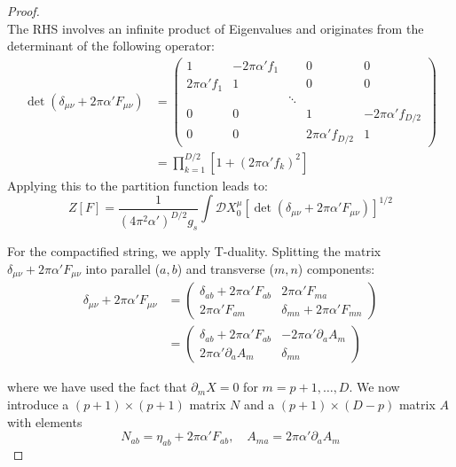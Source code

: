 \begin{tcolorbox}[breakable]
\begin{proof}
\begin{equation}
			\end{equation}
			The RHS involves an infinite product of Eigenvalues and originates from the determinant of the following operator:
			\begin{align*}
				\det (\delta_{\mu\nu} + 2\pi\alpha' F_{\mu\nu}) &= \begin{pmatrix} 
					1 & -2\pi\alpha' f_1 & & 0 & 0 \\
					2\pi\alpha' f_1 & 1 & & 0 & 0 \\
					& & \ddots & & \\
					0 & 0 & & 1 & -2\pi\alpha' f_{D/2} \\
					0 & 0 & & 2\pi\alpha' f_{D/2} & 1 
				\end{pmatrix} \\
				&= \prod_{k=1}^{D/2} [1 + (2\pi\alpha' f_k)^2]
			\end{align*}
			Applying this to the partition function leads to:
			\begin{equation}
				Z[F] = \frac{1}{(4\pi^2\alpha')^{D/2} g_s} \int \mathcal{D}X_0^\mu [ \det(\delta_{\mu\nu} + 2\pi\alpha' F_{\mu\nu}) ]^{1/2}
			\end{equation}
			
			For the compactified string, we apply T-duality. Splitting the matrix $\delta_{\mu\nu} + 2\pi\alpha' F_{\mu\nu}$ into parallel ($a, b$) and transverse ($m, n$) components:
			$$\begin{aligned}
				\delta_{\mu\nu} + 2\pi\alpha' F_{\mu\nu} &= \left( \begin{array}{c|c} 
					\delta_{ab} + 2\pi\alpha' F_{ab} & 2\pi\alpha' F_{ma} \\ \hline 
					2\pi\alpha' F_{am} & \delta_{mn} + 2\pi\alpha' F_{mn} 
				\end{array} \right) \\
				&= \left( \begin{array}{c|c} 
					\delta_{ab} + 2\pi\alpha' F_{ab} & -2\pi\alpha' \partial_a A_m \\ \hline 
					2\pi\alpha' \partial_a A_m & \delta_{mn} 
				\end{array} \right)
			\end{aligned}$$
			
			where we have used the fact that $\partial_m X = 0$ for $m = p+1, \dots, D$. We now introduce a $(p+1) \times (p+1)$ matrix $N$ and a $(p+1) \times (D-p)$ matrix $A$ with elements
			\begin{equation*}
				N_{ab} = \eta_{ab} + 2\pi\alpha' F_{ab}, \quad A_{ma} = 2\pi\alpha' \partial_a A_m
			\end{equation*}  
			

\end{proof}
\end{tcolorbox}
